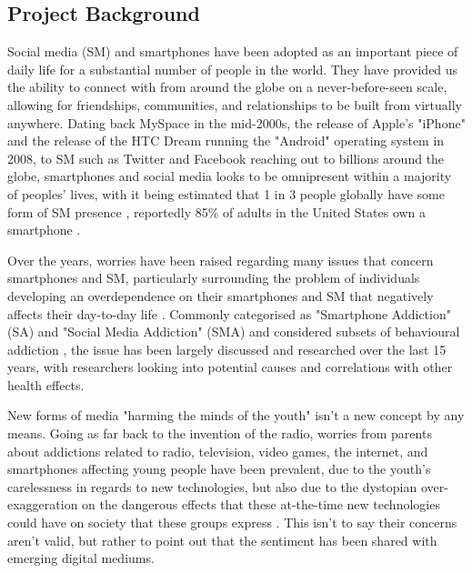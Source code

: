 \documentclass[12pt]{article}
\begin{document}
\subsection{Project Background}
Social media (SM) and smartphones 
have been adopted as an important piece of daily life for a substantial number of people in the world. 
They have provided us the ability to connect with from around the globe on a 
never-before-seen scale, allowing for friendships, communities, and relationships to be built from virtually 
anywhere. Dating back MySpace in the mid-2000s, the release of Apple's "iPhone" and the
release of the HTC Dream running the "Android" operating system in 2008, to SM such as Twitter and Facebook 
reaching out to billions around the globe, smartphones and social 
media looks to be omnipresent within a majority of peoples' lives, with it being estimated that 1 in 3 people 
globally have some form of SM presence \autocite{RefWorks:RefID:88-shah2021rise}, reportedly 85\% of 
adults in the United States own a smartphone \autocite{RefWorks:RefID:94-ouellette2022usefulness}.\newline

Over the years, worries have been raised regarding many issues that concern smartphones and 
SM, particularly surrounding the problem of individuals developing an overdependence on their smartphones 
and SM that negatively affects their day-to-day life 
\autocite{RefWorks:RefID:133-allen2020social, RefWorks:RefID:134-primack2017social}.
Commonly categorised as "Smartphone Addiction" (SA) and "Social Media Addiction" (SMA) and considered 
subsets of behavioural addiction 
\autocite{RefWorks:RefID:68-king2017impact, RefWorks:RefID:66-hou2019social}, the issue has been largely discussed 
and researched over the last 15 years, with researchers looking into potential causes and 
correlations with other health effects.\newline

New forms of media "harming the minds of the youth" isn't a new concept by any means. Going as far back to the 
invention of the radio, worries from parents about addictions related to radio, television, video games, the 
internet, and smartphones affecting young people have been prevalent, due to the youth's carelessness in regards 
to new technologies, but also due to the dystopian over-exaggeration on the dangerous effects that these 
at-the-time new technologies could have on society that these groups express 
\autocite{RefWorks:RefID:91-abeele2021media, RefWorks:RefID:96-adorjan2021smartphone}. \newline
This isn't to say their concerns aren't valid, but rather to point out that the sentiment has been 
shared with emerging digital mediums.\newline
\end{document}
